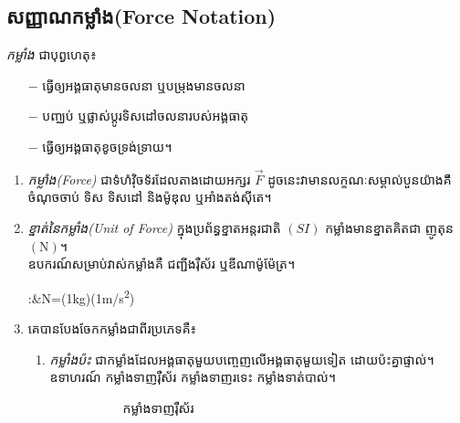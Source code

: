 \subsection{សញ្ញាណកម្លាំង{\en(Force Notation)}}
\begin{definition}
	\emph{\kml កម្លាំង} ជាបុព្វហេតុ៖
	\begin{itemize}
		\item [$-$] ធ្វើឲ្យអង្គធាតុមានចលនា ឬបម្រុងមានចលនា
		\item [$-$] បញ្ឈប់ ឬផ្លាស់ប្តូរទិសដៅចលនារបស់អង្គធាតុ
		\item [$-$] ធ្វើឲ្យអង្គធាតុខូចទ្រង់ទ្រាយ។
	\end{itemize}
\end{definition}
	\begin{enumerate}
		\item \emph{\kml កម្លាំង{\en(Force)}} ជាទំហំវ៉ិចទ័រដែលតាងដោយអក្សរ $\overrightarrow{F}$ ដូចនេះវាមានលក្ខណៈសម្គាល់បួនយ៉ាងគឺ ចំណុចចាប់ ទិស ទិសដៅ និងម៉ូឌុល ឬអាំងតង់ស៊ីតេ។
		\item \emph{\kml ខ្នាត់នៃកម្លាំង{\en(Unit of Force)}} ក្នុងប្រព័ន្ធខ្នាតអន្តរជាតិ $\left(\si{SI}\right)$ កម្លាំងមានខ្នាតគិតជា ញូតុន$\left(\si{\newton}\right)$។\\
		ឧបករណ៍សម្រាប់វាស់កម្លាំងគឺ ជញ្ជីងរ៉ឺស័រ ឬឌីណាម៉ូម៉ែត្រ។
		\begin{flalign*}
			\quad :&\si{\newton}=\left(1\si{\kilogram}\right)\left(1\si{\meter/\second^{2}}\right)
		\end{flalign*}
		\item គេបានបែងចែកកម្លាំងជាពីរប្រភេទគឺ៖	
		\begin{enumerate}
			\item \emph{\kml កម្លាំងប៉ះ} ជាកម្លាំងដែលអង្គធាតុមួយបញ្ចេញលើអង្គធាតុមួយទៀត ដោយប៉ះគ្នាផ្ទាល់។ ឧទាហរណ៍ កម្លាំងទាញរ៉ឺស័រ កម្លាំងទាញរទេះ កម្លាំងទាត់បាល់។
			\begin{figure}[H]
				\centering
				\begin{subfigure}[b]{0.3\textwidth}
					\centering
					\caption{កម្លាំងទាញរ៉ឺស័រ}
				\end{subfigure}
				\begin{subfigure}[b]{0.3\textwidth}
					\centering
\end{subfigure}
\end{figure}
\end{enumerate}
\end{enumerate}
